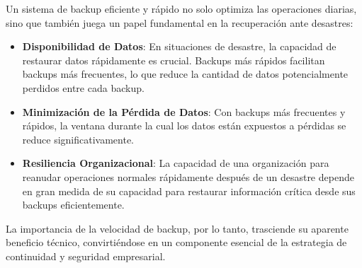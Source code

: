 Un sistema de backup eficiente y rápido no solo optimiza las operaciones diarias, sino que también juega un papel fundamental en la recuperación ante desastres:
\begin{itemize}
    \item \textbf{Disponibilidad de Datos}: En situaciones de desastre, la capacidad de restaurar datos rápidamente es crucial. Backups más rápidos facilitan backups más frecuentes, lo que reduce la cantidad de datos potencialmente perdidos entre cada backup.
    \item \textbf{Minimización de la Pérdida de Datos}: Con backups más frecuentes y rápidos, la ventana durante la cual los datos están expuestos a pérdidas se reduce significativamente.
    \item \textbf{Resiliencia Organizacional}: La capacidad de una organización para reanudar operaciones normales rápidamente después de un desastre depende en gran medida de su capacidad para restaurar información crítica desde sus backups eficientemente.
\end{itemize}

La importancia de la velocidad de backup, por lo tanto, trasciende su aparente beneficio técnico, convirtiéndose en un componente esencial de la estrategia de continuidad y seguridad empresarial.
